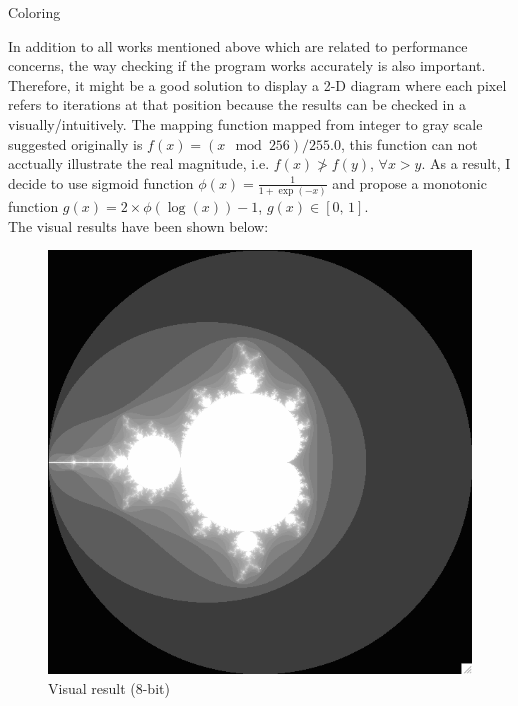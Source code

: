 \documentclass[12pt]{article}
\makeatletter
\renewenvironment{itemize}
{\list{$\bullet$}{\leftmargin\z@ \labelwidth\z@ \itemindent-\leftmargin
\let\makelabel\descriptionlabel}}
{\endlist}
\makeatother
\begin{document}
\begin{itemize}
    \item Coloring
    \begin{flushleft}
        In addition to all works mentioned above which are related to performance concerns, the way checking if the program works accurately is also important. Therefore, it might be a good solution to display a 2-D diagram where each pixel refers to iterations at that position because the results can be checked in a visually/intuitively. The mapping function mapped from integer to gray scale suggested originally is $f(x) = (x \mod 256) / 255.0$, this function can not acctually illustrate the real magnitude, i.e. $f(x) \ngtr f(y)$, $\forall x > y$. As a result, I decide to use sigmoid function $\phi(x) = \frac{1}{1 + \exp(-x)}$ and propose a monotonic function $g(x) = 2 \times \phi(\log(x)) - 1$, $g(x) \in [0, \, 1]$. \\ The visual results have been shown below:
    \end{flushleft}
    \begin{figure}[ht]
        \begin{minipage}{.48\textwidth}
            \includegraphics[scale=.4]{./coloring_hw.png}
            \caption{Visual result (8-bit)}
        \end{minipage}
        \begin{minipage}{.48\textwidth}

\end{minipage}
\end{figure}
\end{itemize}
\end{document}
